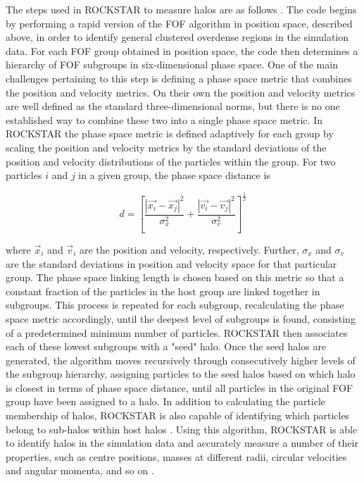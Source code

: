 \documentclass[10pt,letterpaper,final]{iopart}
\numberwithin{equation}{subsection}
\def\ni{\noindent}
\begin{document}
The steps used in ROCKSTAR to measure halos are as follows \cite{Rockstar}. The code begins by performing a rapid version of the FOF algorithm in position space, described above, in order to identify general clustered overdense regions in the simulation data. For each FOF group obtained in position space, the code then determines a hierarchy of FOF subgroups in six-dimensional phase space. One of the main challenges pertaining to this step is defining a phase space metric that combines the position and velocity metrics. On their own the position and velocity metrics are well defined as the standard three-dimensional norms, but there is no one established way to combine these two into a single phase space metric. In ROCKSTAR the phase space metric is defined adaptively for each group by scaling the position and velocity metrics by the standard deviations of the position and velocity distributions of the particles within the group. For two particles $i$ and $j$ in a given group, the phase space distance is

\begin{equation}
d = \left[ \frac{\left | \vec{x_i} - \vec{x_j} \right |^2}{\sigma_x^2} + \frac{\left | \vec{v_i} - \vec{v_j} \right |^2}{\sigma_v^2} \right]^\frac{1}{2}
\end{equation} 

\ni where $\vec{x}_i$ and $\vec{v}_i$ are the position and velocity, respectively. Further, $\sigma_{x}$ and $\sigma_{v}$ are the standard deviations in position and velocity space for that particular group. The phase space linking length is chosen based on this metric so that a constant fraction of the particles in the host group are linked together in subgroups. This process is repeated for each subgroup, recalculating the phase space metric accordingly, until the deepest level of subgroups is found, consisting of a predetermined minimum number of particles. ROCKSTAR then associates each of these lowest subgroups with a "seed" halo. Once the seed halos are generated, the algorithm moves recursively through consecutively higher levels of the subgroup hierarchy, assigning particles to the seed halos based on which halo is closest in terms of phase space distance, until all particles in the original FOF group have been assigned to a halo. In addition to calculating the particle membership of halos, ROCKSTAR is also capable of identifying which particles belong to sub-halos within host halos \cite{Rockstar}. Using this algorithm, ROCKSTAR is able to identify halos in the simulation data and accurately measure a number of their properties, such as centre positions, masses at different radii, circular velocities and angular momenta, and so on \cite{Rockstar}.
\end{document}

